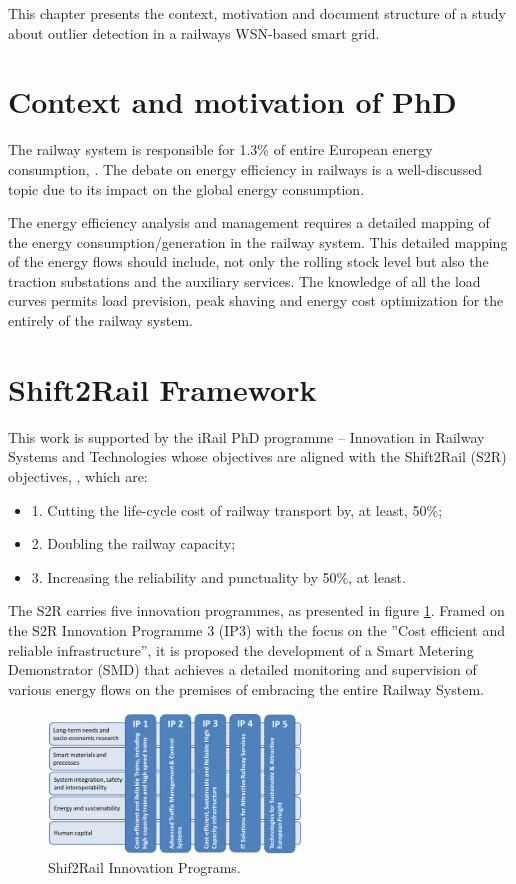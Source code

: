 This chapter presents the context, motivation and document structure of a study about outlier detection in a railways WSN-based smart grid. 

\section{Context and motivation of PhD}

The railway system is responsible for 1.3\% of entire European energy consumption, \cite{iea-uic2016}. 
The debate on energy efficiency in railways is a well-discussed topic due to its impact on the global energy consumption.

The energy efficiency analysis and management requires a detailed mapping of the energy consumption/generation in the railway system. 
This detailed mapping of the energy flows should include, not only the rolling stock level but also the traction substations and the auxiliary services.
The knowledge of all the load curves permits load prevision, peak shaving and energy cost optimization for the entirely of the railway system.


\section{Shift2Rail Framework}

This work is supported by the iRail PhD programme – Innovation in Railway Systems and Technologies whose objectives are aligned with the Shift2Rail (S2R) objectives, \cite{shift2rail2015}, which are: 

\begin{itemize}
		\setlength\itemsep{-0.5em}
		\item 1. Cutting the life-cycle cost of railway transport by, at least, 50\%;
		\item 2. Doubling the railway capacity;
		\item 3. Increasing the reliability and punctuality by 50\%, at least.
\end{itemize}


The S2R carries five innovation programmes, as presented in figure \ref{fig:ips}. Framed on the S2R Innovation Programme 3 (IP3) with the focus on the ”Cost efficient and reliable infrastructure”, it is proposed the development of a Smart Metering Demonstrator (SMD) that achieves a detailed monitoring and supervision of various energy flows on the premises of embracing the entire Railway System.

\begin{figure}[h!]
	\centering
	\includegraphics[width=0.60\textwidth,keepaspectratio]{figures/IPs}
	\caption{Shif2Rail Innovation Programs. }
	\label{fig:ips}
\end{figure}

